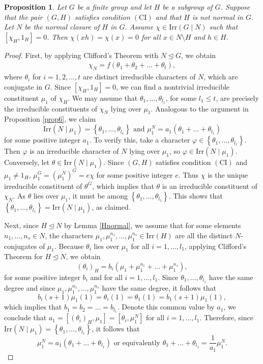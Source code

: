 \documentclass[twoside,a4paper,reqno,11pt]{amsart}
\newcommand{\<}{\langle}
\renewcommand{\>}{\rangle}
\newcommand{\leqs}{\leqslant}
\newcommand{\Irr}{\mathrm {Irr}}
\newcommand{\CI}{\mathrm{(CI)}}
\renewcommand{\leq}{\leqs}
\renewcommand{\:}{\colon}
\newtheorem{prop}[thm]{Proposition}
\theoremstyle{definition}
\begin{document}
\begin{prop}\label{prop7}
Let $G$ be a finite group and let $H$ be a subgroup of $G$.	Suppose that the pair $(G,H)$ satisfies condition $\CI$ and that $H$ is not normal in $G$. Let $N$ be the normal closure of $H$ in $G$. Assume $\chi \in \Irr(G\mid N)$ such that $[\chi_H,1_H]=0$. Then $\chi(xh) = \chi(x)=0$ for all $x\in N\setminus H$ and $h\in H$.
\end{prop}
\begin{proof}
	First, by applying Clifford's Theorem with $N\unlhd G$, we obtain 
	\begin{align}\label{9}
		\chi_N = f(\theta_1+\theta_2+\ldots + \theta_t),
	\end{align}
	where $\theta_i$ for $i=1,2,\ldots,t$ are distinct irreducible characters of $N$, which are conjugate in $G$. Since $[\chi_H,1_H]=0$, we can find a nontrivial irreducible constituent $\mu_1$ of $\chi_H$.
	We may assume that $\theta_1,\ldots,\theta_{l_1}$, for some $l_1\leq t$, are precisely the irreducible constituents of $\chi_N$ lying over $\mu_1$. Analogous to the argument in Proposition \ref{prop6}, we claim $$\Irr(N\mid \mu_1) = \left\{\theta_1,\ldots,\theta_{l_1}\right\}\text{ and }
		\mu_1^N = a_1(\theta_1+\ldots+\theta_{l_1})$$
	for some positive integer $a_1$. To verify this, take a character $\varphi \in \left\{\theta_1,\ldots,\theta_{l_1}\right\}$. Then $\varphi$ is an irreducible character of $N$ lying over $\mu_1$, so $\varphi\in \Irr(N\mid \mu_1)$. Conversely, let $\theta\in \Irr(N\mid \mu_1)$. Since $(G,H)$ satisfies condition $\CI$ and $\mu_1\neq 1_H$, $\mu_1^G = (\mu_1^N)^G = e\chi$ for some positive integer $e$. Thus $\chi$ is the unique irreducible constituent of $\theta^G$, which implies that $\theta$ is an irreducible constituent of $\chi_N$. As $\theta$ lies over $\mu_1$, it must be among $ \left\{\theta_1,\ldots,\theta_{l_1}\right\}$. This shows that $\left\{\theta_1,\ldots,\theta_{l_1}\right\} = \Irr(N\mid \mu_1)$, as claimed.
	
	Next, since $H\unlhd N$ by Lemma \ref{Hnormal}, we assume that for some elements $n_1,\ldots,n_s\in N$,  the characters $\mu_1,\mu_1^{n_1},\ldots,\mu_1^{n_s}\in \Irr(H)$ are all the distinct $N$-conjugates of $\mu_1$.
	Because $\theta_i$ lies over $\mu_1$ for all $i=1,\ldots,l_1$, applying Clifford's Theorem for $H\unlhd N$, we obtain
	$$(\theta_i)_H = b_i(\mu_1+\mu_1^{n_1} + \ldots + \mu_1^{n_s}), $$
	for some positive integer $b_i$ and for all $i = 1,\ldots, l_1$. Since $\theta_1,\ldots,\theta_{l_1}$ have the same degree and since $\mu_1,\mu_1^{n_1},\ldots,\mu_1^{n_s}$ have the same degree,  it follows that
	$$	  b_i(s+1)\mu_1(1)= \theta_i(1)= \theta_1(1) = b_1 (s+1)\mu_1(1),$$  which implies that $b_1=b_2=\dots=b_{l_1}$. Denote this common value by $a_1$, we conclude that $a_1=[(\theta_i)_H,\mu_1] = [\theta_i,\mu_1^N]$ for all $i  = 1,\ldots,l_1$. Therefore, since $\Irr(N\mid\mu_1) = \left\{\theta_1,\ldots,\theta_{l_1}\right\}$,  it follows that 
	\[ \mu_1^N = a_1(\theta_1+\ldots+\theta_{l_1}) \text{ or equivalently } \theta_1 + \ldots + \theta_{l_1} = \dfrac{1}{a_1} \mu_1^N. \]
	

\end{proof}
\end{document}
